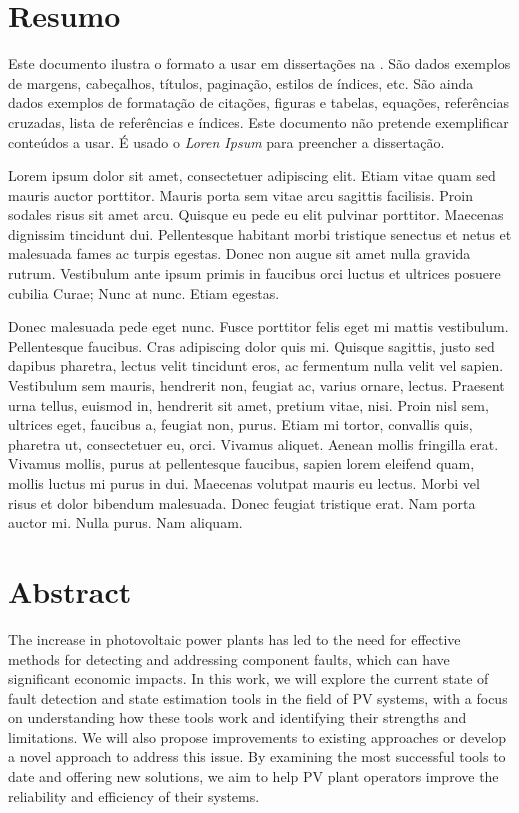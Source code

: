\chapter*{Resumo}

Este documento ilustra o formato a usar em dissertações na \Feup.
São dados exemplos de margens, cabeçalhos, títulos, paginação, estilos
de índices, etc. 
São ainda dados exemplos de formatação de citações, figuras e tabelas,
equações, referências cruzadas, lista de referências e índices.
Este documento não pretende exemplificar conteúdos a usar. 
É usado o \emph{Loren Ipsum} para preencher a dissertação.

Lorem ipsum dolor sit amet, consectetuer adipiscing elit. Etiam vitae
quam sed mauris auctor porttitor. Mauris porta sem vitae arcu sagittis
facilisis. Proin sodales risus sit amet arcu. Quisque eu pede eu elit
pulvinar porttitor. Maecenas dignissim tincidunt dui. Pellentesque
habitant morbi tristique senectus et netus et malesuada fames ac
turpis egestas. Donec non augue sit amet nulla gravida
rutrum. Vestibulum ante ipsum primis in faucibus orci luctus et
ultrices posuere cubilia Curae; Nunc at nunc. Etiam egestas. 

Donec malesuada pede eget nunc. Fusce porttitor felis eget mi mattis
vestibulum. Pellentesque faucibus. Cras adipiscing dolor quis
mi. Quisque sagittis, justo sed dapibus pharetra, lectus velit
tincidunt eros, ac fermentum nulla velit vel sapien. Vestibulum sem
mauris, hendrerit non, feugiat ac, varius ornare, lectus. Praesent
urna tellus, euismod in, hendrerit sit amet, pretium vitae,
nisi. Proin nisl sem, ultrices eget, faucibus a, feugiat non,
purus. Etiam mi tortor, convallis quis, pharetra ut, consectetuer eu,
orci. Vivamus aliquet. Aenean mollis fringilla erat. Vivamus mollis,
purus at pellentesque faucibus, sapien lorem eleifend quam, mollis
luctus mi purus in dui. Maecenas volutpat mauris eu lectus. Morbi vel
risus et dolor bibendum malesuada. Donec feugiat tristique erat. Nam
porta auctor mi. Nulla purus. Nam aliquam. 


\chapter*{Abstract}

The increase in photovoltaic power plants has led to the need for effective
methods for detecting and addressing component faults, which can have
significant economic impacts. In this work, we will explore the current state of
fault detection and state estimation tools in the field of PV systems, with a
focus on understanding how these tools work and identifying their strengths and
limitations. We will also propose improvements to existing approaches or develop
a novel approach to address this issue. By examining the most successful tools
to date and offering new solutions, we aim to help PV plant operators improve
the reliability and efficiency of their systems.